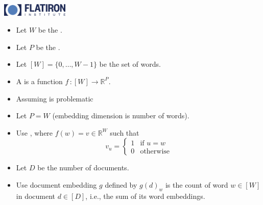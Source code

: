 \documentclass[10pt]{report}
\begin{document}
\sf \mbox{}
\\[12pt]
\spc{\LARGE\bfseries \color{MidnightBlue}{50 years of word embeddings}}
\\[40pt]
\noindent 
\spc{\large\bfseries \color{MidnightBlue}{Bob Carpenter}}
\\[2pt]
\\[-1pt]
\\[2pt]
\vfill 
\noindent 
{}
\hfill
\includegraphics[width=1.25in]{img/flatiron-logo.png}


\begin{itemize}
\item Let $W$ be the .
\item Let $P$ be the .
\item Let   $[W] = \{ 0, \ldots, W - 1 \}$ be the set of words.
\item A  is a function $f \, \textrm{:} \, [W] \rightarrow \mathbb{R}^P$.
\vfill
\item Assuming  is problematic
\end{itemize}

\begin{itemize}
\item Let $P = W$ (embedding dimension is number of words).
\item Use , where $f(w) = v \in
  \mathbb{R}^W$ such that
  $$
  v_u = \begin{cases} 1 & \textrm{if } u = w \\ 0 & \textrm{otherwise} \end{cases}
  $$
\item Let $D$ be the number of documents.
\item Use  document embedding $g$ defined by
  $g(d)_w$ is the count of word $w \in [W]$ in document $d \in [D]$,
  i.e., the sum of its word embeddings.
\end{itemize}
  
\end{document}
